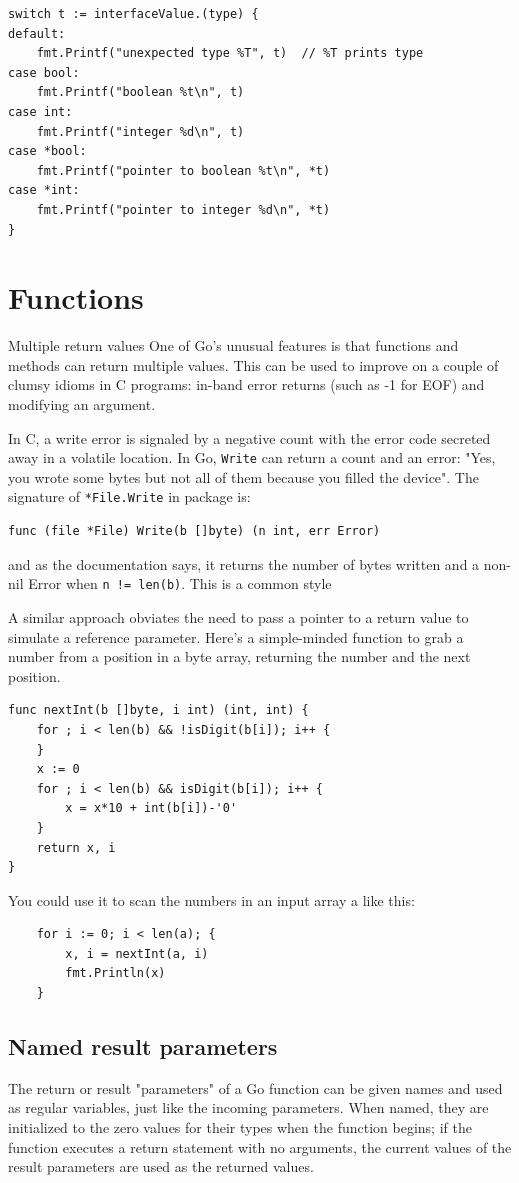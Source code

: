 \begin{lstlisting}
switch t := interfaceValue.(type) {
default:
    fmt.Printf("unexpected type %T", t)  // %T prints type
case bool:
    fmt.Printf("boolean %t\n", t)
case int:
    fmt.Printf("integer %d\n", t)
case *bool:
    fmt.Printf("pointer to boolean %t\n", *t)
case *int:
    fmt.Printf("pointer to integer %d\n", *t)
}
\end{lstlisting}

\section{Functions}
\label{sec:functions}
Multiple return values
One of Go's unusual features is that functions and methods can return multiple
values. This can be used to improve on a couple of clumsy idioms in C programs:
in-band error returns (such as -1 for EOF) and modifying an argument.

In C, a write error is signaled by a negative count with the error code
secreted away in a volatile location. In Go, \lstinline{Write} can return a count and an
error: "Yes, you wrote some bytes but not all of them because you filled the
device". The signature of \lstinline{*File.Write} in package
 is:
\begin{lstlisting}
func (file *File) Write(b []byte) (n int, err Error)
\end{lstlisting}
and as the documentation says, it returns the number of bytes written and a
non-nil Error when \lstinline{n != len(b)}. This is a common style

A similar approach obviates the need to pass a pointer to a return value to
simulate a reference parameter. Here's a simple-minded function to grab a
number from a position in a byte array, returning the number and the next
position.
\begin{lstlisting}
func nextInt(b []byte, i int) (int, int) {
    for ; i < len(b) && !isDigit(b[i]); i++ {
    }
    x := 0
    for ; i < len(b) && isDigit(b[i]); i++ {
        x = x*10 + int(b[i])-'0'
    }
    return x, i
}
\end{lstlisting}
You could use it to scan the numbers in an input array a like this:
\begin{lstlisting}
    for i := 0; i < len(a); {
        x, i = nextInt(a, i)
        fmt.Println(x)
    }
\end{lstlisting}
\subsection{Named result parameters}
The return or result "parameters" of a Go function can be given names and used
as regular variables, just like the incoming parameters. When named, they are
initialized to the zero values for their types when the function begins; if the
function executes a return statement with no arguments, the current values of
the result parameters are used as the returned values.

